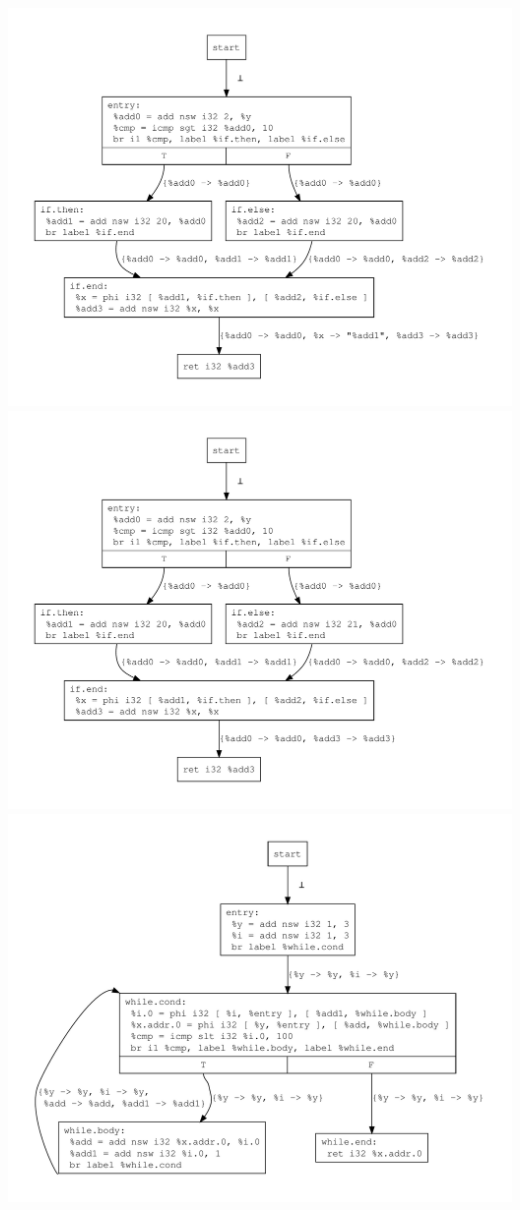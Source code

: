 \documentclass{article}
\theoremstyle{definition}
\begin{document}
\includegraphics[scale=.4]{figures/cse/branch/can-do-cse.pdf}
\includegraphics[scale=.4]{figures/cse/branch/no-do.pdf}
\includegraphics[scale=.4]{figures/cse/loop/loop-can-do-cse.pdf}
\end{document}
